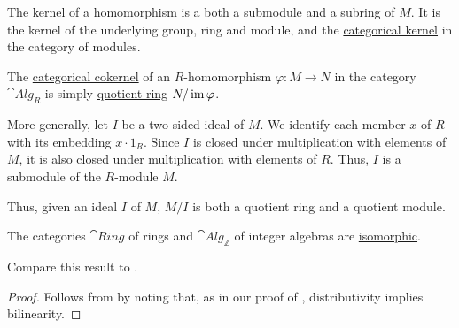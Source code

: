 \begin{definition}
\begin{thmenum}
    The kernel of a homomorphism is a both a submodule and a subring of \( M \). It is the kernel of the underlying group, ring and module, and the \hyperref[def:zero_morphisms/cokernel]{categorical kernel} in the category of modules.

     The \hyperref[def:zero_morphisms/cokernel]{categorical cokernel} of an \( R \)-homomorphism \( \varphi: M \to N \) in the category \( \cat{Alg}_R \) is simply \hyperref[def:ring/quotient]{quotient ring} \( N / \operatorname{im} \varphi \).

    More generally, let \( I \) be a two-sided ideal of \( M \). We identify each member \( x \) of \( R \) with its embedding \( x \cdot 1_R \). Since \( I \) is closed under multiplication with elements of \( M \), it is also closed under multiplication with elements of \( R \). Thus, \( I \) is a submodule of the \( R \)-module \( M \).

    Thus, given an ideal \( I \) of \( M \), \( M / I \) is both a quotient ring and a quotient module.
  \end{thmenum}
\end{definition}

\begin{proposition}\label{thm:ring_is_integer_algebra}
  The categories \( \hyperref[def:ring/category]{\cat{Ring}} \) of rings and \( \hyperref[def:algebra_over_ring/category]{\cat{Alg}_\BbbZ} \) of integer algebras are \hyperref[rem:category_similarity/isomorphism]{isomorphic}.

  Compare this result to .
\end{proposition}
\begin{proof}
  Follows from  by noting that, as in our proof of , distributivity implies bilinearity.
\end{proof}

